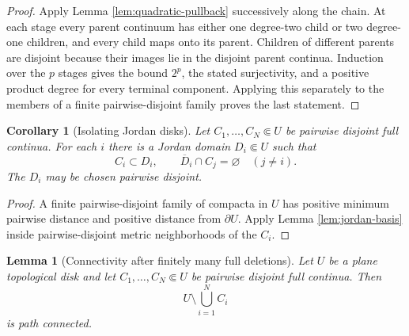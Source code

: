 \documentclass[11pt,reqno]{amsart}
\newtheorem{lemma}[theorem]{Lemma}
\newtheorem{corollary}[theorem]{Corollary}
\theoremstyle{definition}
\theoremstyle{remark}
\begin{document}
\begin{proof}
Apply Lemma \ref{lem:quadratic-pullback} successively along the chain.  At each stage every parent continuum has either one degree-two child or two degree-one children, and every child maps onto its parent.  Children of different parents are disjoint because their images lie in the disjoint parent continua.  Induction over the \(p\) stages gives the bound \(2^p\), the stated surjectivity, and a positive product degree for every terminal component.  Applying this separately to the members of a finite pairwise-disjoint family proves the last statement.
\end{proof}
\begin{corollary}[Isolating Jordan disks]\label{cor:isolating-disks}
Let \(C_1,\dots,C_N\Subset U\) be pairwise disjoint full continua.  For each \(i\) there is a Jordan domain \(D_i\Subset U\) such that
\[
 C_i\subset D_i,\qquad \overline D_i\cap C_j=\varnothing\quad(j\ne i).  \tag{3.3}
\]
The \(D_i\) may be chosen pairwise disjoint.
\end{corollary}

\begin{proof}
A finite pairwise-disjoint family of compacta in \(U\) has positive minimum pairwise distance and positive distance from \(\partial U\).  Apply Lemma \ref{lem:jordan-basis} inside pairwise-disjoint metric neighborhoods of the \(C_i\).
\end{proof}
\begin{lemma}[Connectivity after finitely many full deletions]\label{lem:connectivity}
Let \(U\) be a plane topological disk and let \(C_1,\dots,C_N\Subset U\) be pairwise disjoint full continua.  Then
\[
 U\setminus\bigcup_{i=1}^N C_i
\]
is path connected.
\end{lemma}
\end{document}
